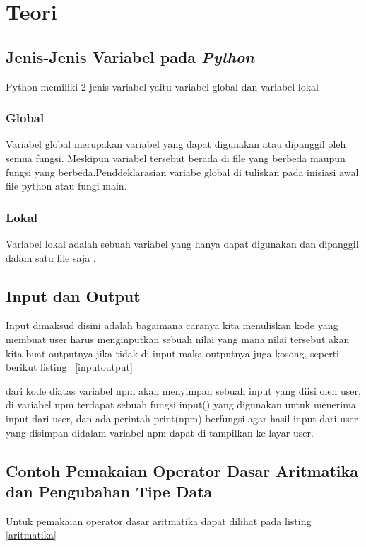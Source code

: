 \chapter{Teori}

\section{Jenis-Jenis Variabel pada \textit{Python}}
Python memiliki 2 jenis variabel yaitu variabel global dan variabel lokal

\subsection{Global}
Variabel global merupakan variabel yang dapat digunakan atau dipanggil oleh semua fungsi. Meskipun variabel tersebut berada di file yang berbeda maupun fungsi yang berbeda.Penddeklarasian variabe global  di tuliskan  pada inisiasi awal file python atau fungi main.

\subsection{Lokal}
Variabel lokal adalah sebuah variabel yang hanya dapat digunakan dan dipanggil dalam satu file saja .

\section{Input dan Output}
Input dimaksud disini adalah bagaimana caranya kita menuliskan kode yang membuat user harus menginputkan sebuah nilai yang mana nilai tersebut akan kita buat outputnya jika tidak di input maka outputnya juga kosong, seperti berikut listing ~\ref{inputoutput}



dari kode diatas variabel npm akan menyimpan sebuah input yang diisi oleh user, di variabel npm terdapat sebuah fungsi input() yang digunakan untuk  menerima input dari user, dan ada perintah print(npm) berfungsi agar hasil input dari user yang disimpan didalam variabel npm dapat di tampilkan ke layar user.

\section{Contoh Pemakaian Operator Dasar Aritmatika dan Pengubahan Tipe Data}
Untuk pemakaian operator dasar aritmatika dapat dilihat pada listing \ref{aritmatika}

